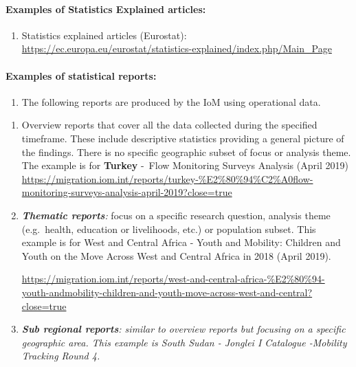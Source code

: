 \documentclass[
]{article}
\providecommand{\tightlist}{%
  \setlength{\itemsep}{0pt}\setlength{\parskip}{0pt}}
\begin{document}
\hypertarget{examples-of-statistics-explained-articles-1}{%
\paragraph{Examples of Statistics Explained articles:}\label{examples-of-statistics-explained-articles-1}}

\begin{enumerate}
\def\labelenumi{\arabic{enumi}.}
\setcounter{enumi}{512}
\tightlist
\item
  Statistics explained articles (Eurostat):
  \url{https://ec.europa.eu/eurostat/statistics-explained/index.php/Main_Page}
\end{enumerate}

\hypertarget{examples-of-statistical-reports-1}{%
\paragraph{Examples of statistical reports:}\label{examples-of-statistical-reports-1}}

\begin{enumerate}
\def\labelenumi{\arabic{enumi}.}
\setcounter{enumi}{513}
\tightlist
\item
  The following reports are produced by the IoM using operational
  data.
\end{enumerate}

\begin{enumerate}
\def\labelenumi{\roman{enumi}.}
\item
  Overview reports that cover all the data collected during the
  specified timeframe. These include descriptive statistics providing
  a general picture of the findings. There is no specific geographic
  subset of focus or analysis theme. The example is for \textbf{Turkey}
  -~{Flow Monitoring Surveys Analysis (April 2019})
  \url{https://migration.iom.int/reports/turkey-\%E2\%80\%94\%C2\%A0flow-monitoring-surveys-analysis-april-2019?close=true}
\item
  \emph{\textbf{Thematic reports}:} focus on a specific research question,
  analysis theme (e.g.~health, education or livelihoods, etc.) or
  population subset. This example is for {West and Central Africa -
  Youth and Mobility: Children and Youth on the Move Across West and
  Central Africa in 2018} (April 2019).

  \url{https://migration.iom.int/reports/west-and-central-africa-\%E2\%80\%94-youth-andmobility-children-and-youth-move-across-west-and-central?close=true}
\item
  \emph{\textbf{Sub regional reports}: similar to overview reports but focusing
  on a specific geographic area. This example is {South Sudan -
  Jonglei I Catalogue -Mobility Tracking Round 4.}}
\end{enumerate}
\end{document}
